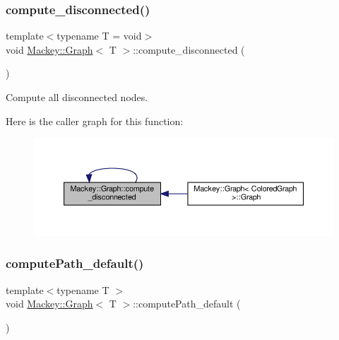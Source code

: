 \subsubsection{\texorpdfstring{compute\+\_\+disconnected()}{compute\_disconnected()}\hspace{0.1cm}{\footnotesize\ttfamily [2/2]}}
{\footnotesize\ttfamily template$<$typename T = void$>$ \\
void \hyperlink{classMackey_1_1Graph}{Mackey\+::\+Graph}$<$ T $>$\+::compute\+\_\+disconnected (\begin{DoxyParamCaption}{ }\end{DoxyParamCaption})\hspace{0.3cm}{\ttfamily [inline]}}



Compute all disconnected nodes. 

Here is the caller graph for this function\+:\nopagebreak
\begin{figure}[H]
\begin{center}
\leavevmode
\includegraphics[width=350pt]{classMackey_1_1Graph_ab4042a555abac8c9c2009f07fbdbb4d5_icgraph}
\end{center}
\end{figure}
\mbox{\label{classMackey_1_1Graph_a61d5b1d08f8efc54fdc639c66b5aeb70}} 
\subsubsection{\texorpdfstring{compute\+Path\+\_\+default()}{computePath\_default()}}
{\footnotesize\ttfamily template$<$typename T $>$ \\
void \hyperlink{classMackey_1_1Graph}{Mackey\+::\+Graph}$<$ T $>$\+::compute\+Path\+\_\+default (\begin{DoxyParamCaption}{ }\end{DoxyParamCaption})}



